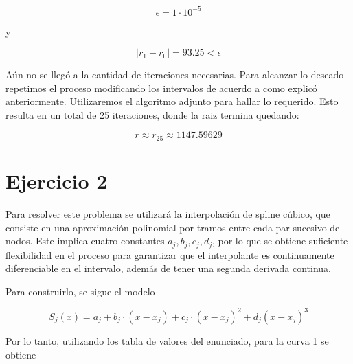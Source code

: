 \begin{equation} \epsilon = 1\cdot10^{-5}\end{equation}

y

\begin{equation}|r_1 - r_0| = 93.25 < \epsilon  \end{equation}

Aún no se llegó a la cantidad de iteraciones necesarias. Para alcanzar lo deseado repetimos el proceso modificando los intervalos de acuerdo a como explicó anteriormente. Utilizaremos el algoritmo adjunto para hallar lo requerido. Esto resulta en un total de 25 iteraciones, donde la raiz termina quedando:

\begin{equation}
    r \approx r_{25} \approx 1147.59629
\end{equation}


\section{Ejercicio 2}

Para resolver este problema se utilizará la interpolación de spline cúbico, que consiste en una aproximación polinomial por tramos entre cada par sucesivo de nodos. Este implica cuatro constantes $a_j, b_j, c_j, d_j$, por lo que se obtiene suficiente flexibilidad en el proceso para garantizar que el interpolante es continuamente diferenciable en el intervalo, además de tener una segunda derivada continua. 

Para construirlo, se sigue el modelo

\begin{equation}
    S_j(x) = a_j + b_j\cdot (x-x_j) + c_j\cdot (x-x_j)^2 + d_j (x-x_j)^3
\end{equation}

Por lo tanto, utilizando los tabla de valores del enunciado, para la curva 1 se obtiene

